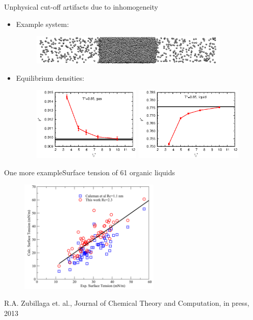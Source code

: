 \documentclass{beamer}
\newcommand{\bluec}[1]{{\color{blue} #1}}
\begin{document}
\begin{frame}{Unphysical cut-off artifacts due to inhomogeneity}
  \begin{itemize}\itemsep 10pt
  \item<1-> Example system:
    \begin{figure}
      \centering
      \includegraphics[width=0.9\textwidth]{figs/t0.85-n16000-rc07.5uni/confout-02.eps}
    \end{figure}
  \item<2-> Equilibrium densities:
    \begin{figure}
    \centering
    \includegraphics[width=0.49\textwidth]{figs/converge.new/t0p85-gas-1.eps} 
    \includegraphics[width=0.49\textwidth]{figs/converge.new/t0p85-liquid-1.eps} 
  \end{figure}  
  \end{itemize}
\end{frame}

\begin{frame}{One more example}{Surface tension of 61 organic liquids}
  \begin{figure}
    \centering
    \includegraphics[width=0.6\textwidth]{figs/short-range/membrane-example.pdf} 
  \end{figure}
  \bluec{R.A. Zubillaga et. al., Journal of Chemical Theory and Computation, in press, 2013}
\end{frame}
\end{document}
